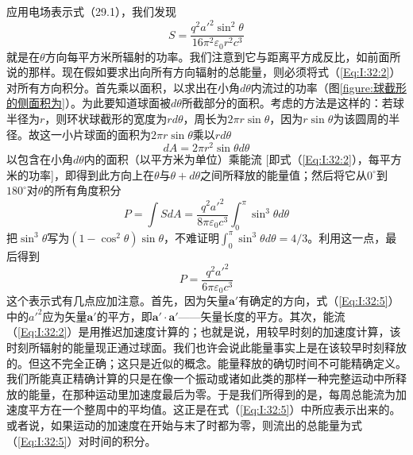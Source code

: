 应用电场表示式（29.1），我们发现
\begin{equation}
    \label{Eq:I:32:2}
    S = \frac{q^2a'^2\sin^2\theta}{16\pi^2\varepsilon_0r^2c^3}
\end{equation}
就是在$\theta$方向每平方米所辐射的功率。我们注意到它与距离平方成反比，如前面所说的那样。现在假如要求出向所有方向辐射的总能量，则必须将式（\ref{Eq:I:32:2}）对所有方向积分。首先乘以面积，以求出在小角$d\theta$内流过的功率（图\ref{figure:球截形的侧面积为}）。为此要知道球面被$d\theta$所截部分的面积。考虑的方法是这样的：若球半径为$r$，则环状球截形的宽度为$rd\theta$，周长为$2\pi r\sin\theta$，因为$r\sin\theta$为该圆周的半径。故这一小片球面的面积为$2\pi r\sin\theta$乘以$rd\theta$
\begin{equation}
    \label{Eq:I:32:3}
    dA=2\pi r^2\sin\theta d\theta
\end{equation}
以包含在小角$d\theta$内的面积（以平方米为单位）乘能流 [即式（\ref{Eq:I:32:2}），每平方米的功率]，即得到此方向上在$\theta$与$\theta+d\theta$之间所释放的能量值；然后将它从$0^\circ$到$180^\circ$对$\theta$的所有角度积分
\begin{equation}
    \label{Eq:I:32:4}
    P = \int SdA = \frac{q^2a'^2}{8\pi\varepsilon_0c^3}\int_0^\pi \sin^3\theta d\theta
\end{equation}
把$\sin^3\theta$写为$(1-\cos^2\theta)\sin\theta$，不难证明$\int_0^\pi \sin^3\theta d\theta=4/3$。利用这一点，最后得到
\begin{equation}
    \label{Eq:I:32:5}
    P = \frac{q^2a'^2}{6\pi\varepsilon_0c^3}
\end{equation}
这个表示式有几点应加注意。首先，因为矢量$\boldsymbol{a}'$有确定的方向，式（\ref{Eq:I:32:5}）中的$a'^2$应为矢量$\boldsymbol{a}'$的平方，即$\boldsymbol{a}' \cdot \boldsymbol{a}'$——矢量长度的平方。其次，能流（\ref{Eq:I:32:2}）是用推迟加速度计算的；也就是说，用较早时刻的加速度计算，该时刻所辐射的能量现正通过球面。我们也许会说此能量事实上是在该较早时刻释放的。但这不完全正确；这只是近似的概念。能量释放的确切时间不可能精确定义。我们所能真正精确计算的只是在像一个振动或诸如此类的那样一种完整运动中所释放的能量，在那种运动里加速度最后为零。于是我们所得到的是，每周总能流为加速度平方在一个整周中的平均值。这正是在式（\ref{Eq:I:32:5}）中所应表示出来的。或者说，如果运动的加速度在开始与末了时都为零，则流出的总能量为式（\ref{Eq:I:32:5}）对时间的积分。

